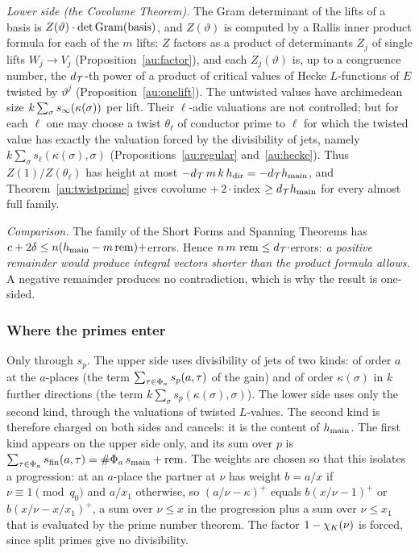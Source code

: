 \documentclass[10pt]{amsart}
\theoremstyle{definition}
\theoremstyle{remark}
\begin{document}
\emph{Lower side (the Covolume Theorem).} The Gram determinant of the lifts of a basis is
$Z(\vartheta)\cdot\det\operatorname{Gram}(\text{basis})$, and $Z(\vartheta)$ is computed by a Rallis inner
product formula for each of the $m$ lifts: $Z$ factors as a product of determinants $Z_j$ of
single lifts $W_j\to V_j$ (Proposition~\ref{au:factor}), and each $Z_j(\vartheta)$ is, up to a
congruence number, the $d_{\mathcal T}$-th power of a product of critical values of Hecke $L$-functions of
$E$ twisted by $\vartheta^j$ (Proposition~\ref{au:onelift}). The untwisted values have
archimedean size $k\sum_\sigma s_\infty(\kappa(\sigma))$ per lift. Their $\ell$-adic valuations are
not controlled; but for each $\ell$ one may choose a twist $\theta_\ell$ of conductor prime to
$\ell$ for which the twisted value has exactly the valuation forced by the divisibility of jets,
namely $k\sum_\sigma s_\ell(\kappa(\sigma),\sigma)$ (Propositions~\ref{au:regular}
and~\ref{au:hecke}). Thus $Z(1)/Z(\theta_\ell)$ has height at most $-d_{\mathcal T}\,m\,k\,h_{\mathrm{dir}}=
-d_{\mathcal T}h_{\mathrm{main}}$, and Theorem~\ref{au:twistprime} gives covolume $+\,2\cdot$index
$\ge d_{\mathcal T}h_{\mathrm{main}}$ for every almost full family.

\emph{Comparison.} The family of the Short Forms and Spanning Theorems has $c+2\delta\le n(h_{\mathrm{main}}-m\operatorname{rem})+$errors.
Hence $n\,m\,\operatorname{rem}\le d_{\mathcal T}\cdot$errors: \emph{a positive remainder would produce integral
vectors shorter than the product formula allows.} A negative remainder produces no contradiction,
which is why the result is one-sided.

\subsubsection*{Where the primes enter}
Only through $s_p$. The upper side uses divisibility of jets of two kinds: of order $a$ at the
$a$-places (the term $\sum_{\tau\in\Phi_a}s_p(a,\tau)$ of the gain) and of order $\kappa(\sigma)$
in $k$ further directions (the term $k\sum_\sigma s_p(\kappa(\sigma),\sigma)$). The lower side
uses only the second kind, through the valuations of twisted $L$-values. The second kind is
therefore charged on both sides and cancels: it is the content of $h_{\mathrm{main}}$. The first kind
appears on the upper side only, and its sum over $p$ is $\sum_{\tau\in\Phi_a}s_{\mathrm{fin}}(a,\tau)=
\#\Phi_a\,s_{\mathrm{main}}+\operatorname{rem}$. The weights are chosen so that this isolates a progression: at an
$a$-place the partner at $\nu$ has weight $b=a/x$ if $\nu\equiv1\pmod{q_0}$ and $a/x_1$ otherwise,
so $(a/\nu-\kappa)^+$ equals $b(x/\nu-1)^+$ or $b(x/\nu-x/x_1)^+$, a sum over $\nu\le x$ in the
progression plus a sum over $\nu\le x_1$ that is evaluated by the prime number theorem. The factor
$1-\chi_K(\nu)$ is forced, since split primes give no divisibility.
\end{document}
